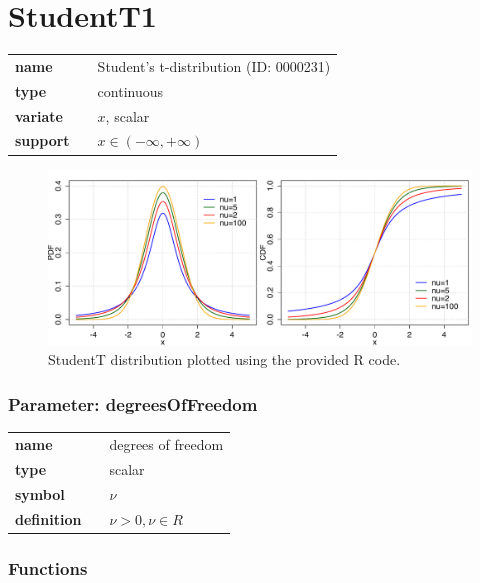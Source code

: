 \section*{StudentT1} 

  \bigskip 

\begin{tabular}{p{2cm}cl}
\textbf{name} & & Student's t-distribution (ID: 0000231)\\ 
 
\textbf{type} & & continuous \\ 

\textbf{variate} & & $x$, scalar \\ 

\textbf{support} & & $x \in (-\infty,+\infty)$
\end{tabular}

\begin{figure}[ht!]
\centering
  \includegraphics[width=140mm]{pics/StudentT.pdf}
 \caption{StudentT distribution plotted using the provided R code.}
 \label{fig:StudentT}
\end{figure}

\subsubsection*{Parameter: degreesOfFreedom}

\noindent\begin{tabular}{p{2cm}cl}
\textbf{name} & & degrees of freedom \\
\textbf{type} & & scalar \\
\textbf{symbol} & & $\nu$  \\
\textbf{definition} & & $\nu > 0, \nu \in  R$
\end{tabular}
\subsubsection*{Functions}

